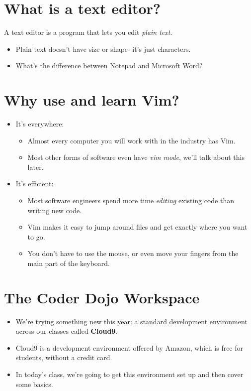 \documentclass[aspectratio=1610]{beamer}                  %
\newcommand{\srule}{
	\rule{\textwidth}{1pt}\\
}
\newlength{\subsecwidth}
\newenvironment{slide}{
	\begin{frame}                                    %
		\settowidth{\subsecwidth}{\insertsubsection} %
		\ifthenelse{\dimtest{\subsecwidth}{<}{1pt}}{ %
			\frametitle{\huge \insertsection\\             %
				\vspace{-1ex}                            %
			}
		}{                                           %
			\frametitle{\huge \insertsection\ -- \insertsubsection\\ %
				\vspace{-1ex}                            %
			}
		}
		\Large                                       %
	}{
	\end{frame}
}
\begin{document}
\section{What is a text editor?}
\begin{slide}
    A text editor is a program that lets you edit \textit{plain text}.
    \begin{itemize}
        \item Plain text doesn't have size or shape- it's just characters.
        \item What's the difference between Notepad and Microsoft Word?
    \end{itemize}
\end{slide}

\section{Why use and learn Vim?}
\begin{slide}
    \begin{itemize}
        \item It's everywhere:
            \begin{itemize}
                \item Almost every computer you will work with in the industry has Vim.
                \item Most other forms of software even have \textit{vim mode}, we'll talk about this later.
            \end{itemize}
        \item It's efficient:
            \begin{itemize}
                \item Most software engineers spend more time \textit{editing} existing code than writing new code.
                \item Vim makes it easy to jump around files and get exactly where you want to go.
                \item You don't have to use the mouse, or even move your fingers from the main part of the keyboard.
            \end{itemize}
    \end{itemize}
\end{slide}

\section{The Coder Dojo Workspace}
\begin{slide}
    \begin{itemize}
        \item We're trying something new this year: a standard development environment
            across our classes called \textbf{Cloud9}.

        \item Cloud9 is a development environment offered by Amazon, which is free for
            students, without a credit card.

        \item In today's class, we're going to get this environment set up and then cover some basics.
    \end{itemize}
\end{slide}
\end{document}
